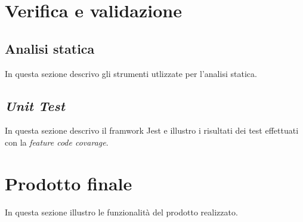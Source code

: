 \section{Verifica e validazione}

\subsection{Analisi statica}
In questa sezione descrivo gli strumenti utlizzate per l'analisi statica.

\subsection{\emph{Unit Test}}
In questa sezione descrivo il framwork Jest e illustro i risultati dei test effettuati con la \emph{feature code covarage}.

\section{Prodotto finale}
In questa sezione illustro le funzionalità del prodotto realizzato.